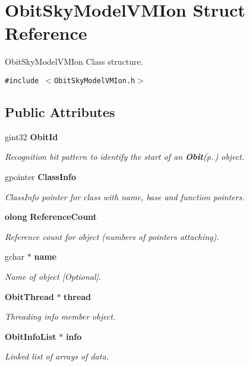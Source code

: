 \section{Obit\-Sky\-Model\-VMIon Struct Reference}
\label{structObitSkyModelVMIon}
Obit\-Sky\-Model\-VMIon Class structure.  


{\tt \#include $<$Obit\-Sky\-Model\-VMIon.h$>$}

\subsection*{Public Attributes}
\begin{CompactItemize}
\item 
gint32 {\bf Obit\-Id}
\begin{CompactList}\small\item\em Recognition bit pattern to identify the start of an {\bf Obit}{\rm (p.\,\pageref{structObit})} object. \item\end{CompactList}\item 
gpointer {\bf Class\-Info}
\begin{CompactList}\small\item\em Class\-Info pointer for class with name, base and function pointers. \item\end{CompactList}\item 
{\bf olong} {\bf Reference\-Count}
\begin{CompactList}\small\item\em Reference count for object (numbers of pointers attaching). \item\end{CompactList}\item 
gchar $\ast$ {\bf name}
\begin{CompactList}\small\item\em Name of object [Optional]. \item\end{CompactList}\item 
{\bf Obit\-Thread} $\ast$ {\bf thread}
\begin{CompactList}\small\item\em Threading info member object. \item\end{CompactList}\item 
{\bf Obit\-Info\-List} $\ast$ {\bf info}
\begin{CompactList}\small\item\em Linked list of arrays of data. \item\end{CompactList}\item 

\end{CompactItemize}
